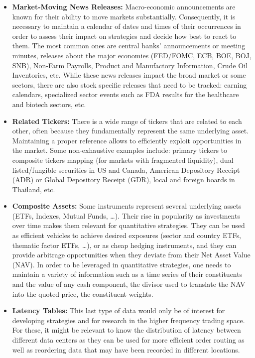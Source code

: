 \begin{itemize}
\item \textbf{Market-Moving News Releases:} Macro-economic announcements are known for their ability to move markets substantially. Consequently, it is necessary to maintain a calendar of dates and times of their occurrences in order to assess their impact on strategies and decide how best to react to them. The most common ones are central banks' announcements or meeting minutes, releases about the major economies (FED/FOMC, ECB, BOE, BOJ, SNB), Non-Farm Payrolls, Product and Manufactory Information, Crude Oil Inventories, etc. While these news releases impact the broad market or some sectors, there are also stock specific releases that need to be tracked: earning calendars, specialized sector events such as FDA results for the healthcare and biotech sectors, etc.


\item \textbf{Related Tickers:} There is a wide range of tickers that are related to each other, often because they fundamentally represent the same underlying asset. Maintaining a proper reference allows to efficiently exploit opportunities in the market. Some non-exhaustive examples include: primary tickers to composite tickers mapping (for markets with fragmented liquidity), dual listed/fungible securities in US and Canada, American Depository Receipt (ADR) or Global Depository Receipt (GDR), local and foreign boards in Thailand, etc.


\item \textbf{Composite Assets:} Some instruments represent several underlying assets (ETFs, Indexes, Mutual Funds, \dots). Their rise in popularity as investments over time makes them relevant for quantitative strategies. They can be used as efficient vehicles to achieve desired exposures (sector and country ETFs, thematic factor ETFs, \dots), or as cheap hedging instruments, and they can provide arbitrage opportunities when they deviate from their Net Asset Value (NAV). 
In order to be leveraged in quantitative strategies, one needs to maintain a variety of information such as a time series of their constituents and the value of any cash component, the divisor used to translate the NAV into the quoted price, the constituent weights. 


\item \textbf{Latency Tables:} This last type of data would only be of interest for developing strategies and for research in the higher frequency trading space. For these, it might be relevant to know the distribution of latency between different data centers as they can be used for more efficient order routing as well as reordering data that may have been recorded in different locations.
\end{itemize}


